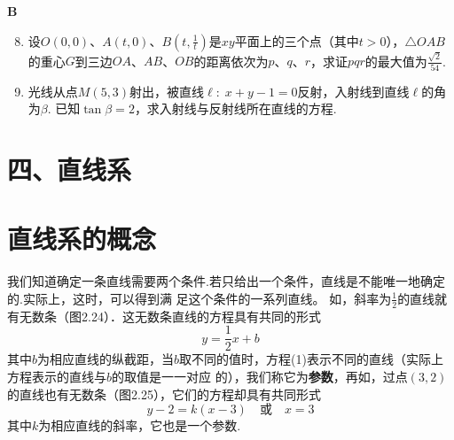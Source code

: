 \begin{center}
    \bfseries B
\end{center}

\begin{enumerate}\setcounter{enumi}{7}
    \item 设$O(0,0)$、$A(t,0)$、$B\left(t,\frac{1}{t}\right)$是$xy$平面上的三个点（其中$t>0$），$\triangle OAB$的重心$G$到三边$OA$、$AB$、$OB$的距离依次为$p$、$q$、$r$，求证$pqr$的最大值为$\frac{\sqrt{2}}{54}$.
    \item 光线从点$M(5,3)$射出，被直线$\ell:\; x+y-1=0$反射，入射线到直线$\ell$的角为$\beta$. 已知$\tan\beta=2$，求入射线与反射线所在直线的方程.
\end{enumerate}


\section*{四、直线系}

\section{直线系的概念}
我们知道确定一条直线需要两个条件.若只给出一个条件，直线是不能唯一地确定的.实际上，这时，可以得到满
足这个条件的一系列直线。
如，斜率为$\frac{1}{2}$的直线就有无数条（图2.24）．这无数条直线的方程具有共同的形式
\begin{equation}
    y=\frac{1}{2}x+b \tag{1}
\end{equation}
其中$b$为相应直线的纵截距，当$b$取不同的值时，方程(1)表示不同的直线（实际上方程表示的直线与$b$的取值是一一对应
的），我们称它为\textbf{参数}，再如，过点$(3,2)$的直线也有无数条（图2.25），它们的方程却具有共同形式
\begin{equation}
    y-2=k(x-3)\quad \text{或}\quad x=3\tag{2}
\end{equation}
其中$k$为相应直线的斜率，它也是一个参数.

